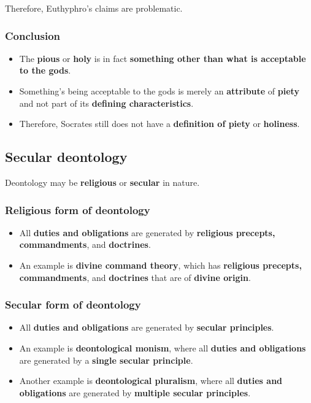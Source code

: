 \documentclass[11pt]{article}
\begin{document}
Therefore, Euthyphro's claims are problematic.
\subsubsection{Conclusion}
\label{sec:org0ded945}
\begin{itemize}
\item The \textbf{pious} or \textbf{holy} is in fact \textbf{something other than what is acceptable to the gods}.
\item Something's being acceptable to the gods is merely an \textbf{attribute} of \textbf{piety} and not part of its \textbf{defining characteristics}.
\item Therefore, Socrates still does not have a \textbf{definition of piety} or \textbf{holiness}.
\end{itemize}

 \newpage
\subsection{Secular deontology}
\label{sec:org54f2892}
Deontology may be \textbf{religious} or \textbf{secular} in nature.
\subsubsection{Religious form of deontology}
\label{sec:orgcb2d7fd}
\begin{itemize}
\item All \textbf{duties and obligations} are generated by \textbf{religious precepts, commandments}, and \textbf{doctrines}.
\item An example is \textbf{divine command theory}, which has \textbf{religious precepts, commandments}, and \textbf{doctrines} that are of \textbf{divine origin}.
\end{itemize}
\subsubsection{Secular form of deontology}
\label{sec:org731f7a0}
\begin{itemize}
\item All \textbf{duties and obligations} are generated by \textbf{secular principles}.
\item An example is \textbf{deontological monism}, where all \textbf{duties and obligations} are generated by a \textbf{single secular principle}.
\item Another example is \textbf{deontological pluralism}, where all \textbf{duties and obligations} are generated by \textbf{multiple secular principles}.
\end{itemize}
\end{document}
